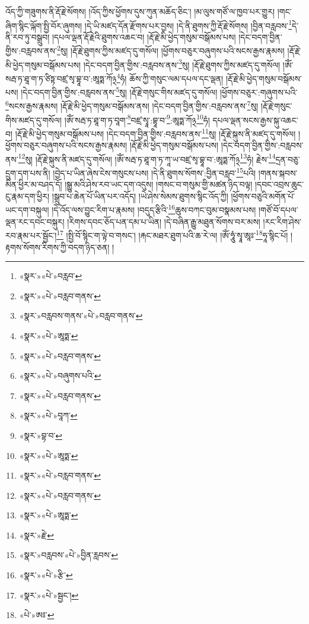འོད་ཀྱི་གཟུགས་ནི་རྡོ་རྗེ་སོགས། །འོད་ཀྱིས་ཕྱོགས་དུས་ཀུན་མཆོད་ཅིང་། །མ་ལུས་གཙོ་ལ་ཁྱབ་པར་གྱུར། །གང་ཞིག་སྙིང་ལྐོག་སྤྱི་བོར་ཞུགས། །དེ་ཡི་མཛད་དོན་རྫོགས་པར་བྱས། །དེ་ནི་ཐུགས་ཀྱི་རྡོ་རྗེ་སོགས། །བྱིན་བརླབས་\footnote{«སྣར་»«པེ་»བརླབ་}དེ་ནི་རབ་ཏུ་བསྒྲུབ། །དཔལ་ལྡན་རྡོ་རྗེའི་ཐུགས་འཆང་བ། །རྡོ་རྗེ་མི་ཕྱེད་གསུམ་བསྒོམས་པས། །དེང་བདག་བྱིན་གྱིས་:བརླབས་ནས་\footnote{«སྣར་»«པེ་»བརླབ་གནས་}སུ། །རྡོ་རྗེ་ཐུགས་ཀྱིས་མཛད་དུ་གསོལ། །ཕྱོགས་བཅུར་བཞུགས་པའི་སངས་རྒྱས་རྣམས། །རྡོ་རྗེ་མི་ཕྱེད་གསུམ་བསྒོམས་པས། །དེང་བདག་བྱིན་གྱིས་:བརླབས་ནས་\footnote{«སྣར་»བརླབས་གནས་«པེ་»བརླབ་གནས་}སུ། །རྡོ་རྗེ་ཐུགས་ཀྱིས་མཛད་དུ་གསོལ། །ཨོཾ་སརྦ་ཏ་ཐཱ་ག་ཏ་ཙིཏྟ་བཛྲ་སྭ་བྷཱ་བ་:ཨཱཏྨ་ཀོ྅\footnote{«སྣར་»«པེ་»ཨཱཏྨ་}ཧཾ། ཆོས་ཀྱི་གསུང་ལམ་དཔལ་དང་ལྡན། །རྡོ་རྗེ་མི་ཕྱེད་གསུམ་བསྒོམས་པས། །དེང་བདག་བྱིན་གྱིས་:བརླབས་ནས་\footnote{«སྣར་»«པེ་»བརླབ་གནས་}སུ། །རྡོ་རྗེ་གསུང་གིས་མཛད་དུ་གསོལ། །ཕྱོགས་བཅུར་:གཞུགས་པའི་\footnote{«སྣར་»«པེ་»བཞུགས་པའི་}སངས་རྒྱས་རྣམས། །རྡོ་རྗེ་མི་ཕྱེད་གསུམ་བསྒོམས་ནས། །དེང་བདག་བྱིན་གྱིས་:བརླབས་ནས་\footnote{«སྣར་»«པེ་»བརླབ་གནས་}སུ། །རྡོ་རྗེ་གསུང་གིས་མཛད་དུ་གསོལ། །ཨོཾ་སརྦ་ཏ་ཐཱ་ག་ཏ་བཱག་\footnote{«སྣར་»«པེ་»བཱཀ་}བཛྲ་སྭཱ་:བྷཱ་བ་\footnote{«སྣར་»བྷ་བ་}:ཨཱཏྨ་ཀོ྅\footnote{«སྣར་»«པེ་»ཨཱཏྨ་}ཧཾ། དཔལ་ལྡན་སངས་རྒྱས་སྐུ་འཆང་བ། །རྡོ་རྗེ་མི་ཕྱེད་གསུམ་བསྒོམས་པས། །དེང་བདག་བྱིན་གྱིས་:བརླབས་ནས་\footnote{«སྣར་»«པེ་»བརླབ་གནས་}སུ། །རྡོ་རྗེ་སྐུས་ནི་མཛད་དུ་གསོལ། །ཕྱོགས་བཅུར་བཞུགས་པའི་སངས་རྒྱས་རྣམས། །རྡོ་རྗེ་མི་ཕྱེད་གསུམ་བསྒོམས་པས། །དེང་བདག་བྱིན་གྱིས་:བརླབས་ནས་\footnote{«སྣར་»«པེ་»བརླབ་གནས་}སུ། །རྡོ་རྗེ་སྐུས་ནི་མཛད་དུ་གསོལ། །ཨོཾ་སརྦ་ཏ་ཐཱ་ག་ཏ་ཀཱ་ཡ་བཛྲ་སྭ་བྷཱ་བ་:ཨཱཏྨ་ཀོ྅\footnote{«སྣར་»«པེ་»ཨཱཏྨ་}ཧཾ། རྗེས་\footnote{«སྣར་»རྗེ་}དྲན་བཅུ་དྲུག་དག་པས་ནི། །བྱེད་པ་ཡིན་ཞེས་ངེས་གསུངས་པས། །དེ་ནི་ཐུགས་སོགས་:བྱིན་བརླབ་\footnote{«སྣར་»བརླབས་«པེ་»བྱིན་རླབས་}པའི། །གནས་སྐབས་མིན་ཕྱིར་མ་བཤད་དོ། །སྒྱུ་མའི་ཤེས་རབ་ཡང་དག་འདུས། །གསང་བ་གསུམ་གྱི་མཚན་ཉིད་བལྟ། །དབང་འབྲས་ཆུང་ངུ་རྣམ་དག་ཕྱིར། །སྒྲུབ་པ་ཆེན་པོ་ཡིན་པར་འདོད། །ཡེ་ཤེས་སེམས་ཐུགས་སྙིང་འོད་ཀྱི། །ཕྱོགས་བཅུའི་མགོན་པོ་ཡང་དག་བསྐུལ། །དེ་འོད་ལས་བྱུང་རིག་པ་རྣམས། །བདུད་རྩིའི་\footnote{«སྣར་»«པེ་»རྩི་}ཆུས་བཀང་བུམ་བསྣམས་པས། །གཙོ་བོ་དཔལ་ལྡན་རང་དབང་བསྐུར། །རིགས་དབང་ཅོད་པན་དམ་པ་ཡིན། །དེ་བཞིན་རྒྱུ་མཐུན་སོགས་བར་མས། །རང་རིག་ཤེས་རབ་རྣམ་པར་སྦྱོང་།\footnote{«སྣར་»«པེ་»སྦྱང་།} །སྤྱི་བོ་སྙིང་ག་ལྟེ་བ་གསང་། །རྐང་མཐར་ཐུག་པའི་ཆ་རེ་ལ། །ཨོཾ་ཧཱུཾ་སྭཱ་ཨཱཿ་\footnote{«པེ་»ཨཿ་}ཧཱ་སྙིང་པོ། །རྟགས་སོགས་རིགས་ཀྱི་བདག་ཉིད་ཅན། །
